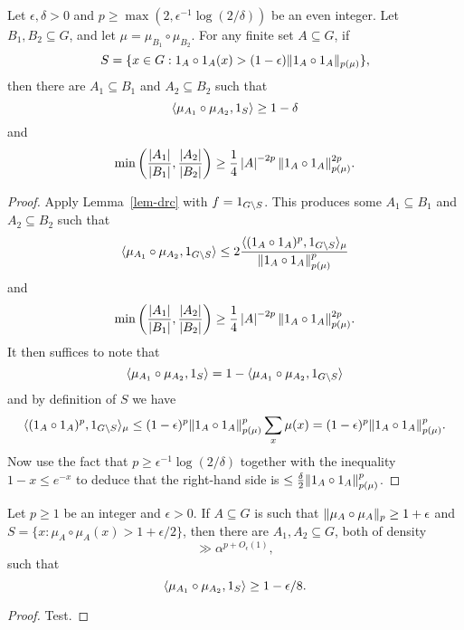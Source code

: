 \begin{lemma}
\label{lem-sift}
\leanok
Let $\epsilon,\delta >0$ and $p\geq \max(2,\epsilon^{-1}\log(2/\delta))$ be an even integer. Let $B_1,B_2\subseteq G$, and let $\mu=\mu_{B_1}\circ\mu_{B_2}$. For any finite set $A\subseteq G$, if
\[S=\{ x\in G: 1_{A}\circ 1_{A}(x)>(1-\epsilon)\lVert 1_{A}\circ 1_{A}\rVert_{p(\mu)}\},\]
then there are $A_1\subseteq B_1$ and $A_2\subseteq B_2$ such that
\[\langle \mu_{A_1}\circ\mu_{A_2},1_{S}\rangle \geq 1-\delta\]
and
\[\min\left( \frac{\left\lvert A_1\right\rvert}{\left\lvert B_1\right\rvert},\frac{\left\lvert A_2\right\rvert}{\left\lvert B_2\right\rvert}\right)\geq \frac{1}{4}\left\lvert A\right\rvert^{-2p}\lVert 1_{A}\circ 1_{A}\rVert_{p(\mu)}^{2p}.\]
\end{lemma}

\begin{proof}
\leanok
Apply Lemma~\ref{lem-drc} with $f=1_{G\backslash S}$. This produces some $A_1\subseteq B_1$ and $A_2\subseteq B_2$ such that
\[\langle \mu_{A_1}\circ \mu_{A_2}, 1_{G\backslash S}\rangle\leq 2\frac{\langle (1_{A}\circ 1_{A})^p,1_{G\backslash S}\rangle_\mu}{\lVert 1_{A}\circ 1_{A}\rVert_{p(\mu)}^p}\]
and
\[\min\left( \frac{\left\lvert A_1\right\rvert}{\left\lvert B_1\right\rvert},\frac{\left\lvert A_2\right\rvert}{\left\lvert B_2\right\rvert}\right)\geq \frac{1}{4}\left\lvert A\right\rvert^{-2p}\lVert 1_{A}\circ 1_{A}\rVert_{p(\mu)}^{2p}.\]
It then suffices to note that
\[\langle \mu_{A_1}\circ \mu_{A_2},1_{S}\rangle=1-\langle \mu_{A_1}\circ \mu_{A_2},1_{G\backslash S}\rangle\]
and by definition of $S$ we have
\[\langle (1_{A}\circ 1_{A})^p,1_{G\backslash S}\rangle_\mu\leq (1-\epsilon)^p\lVert 1_{A}\circ 1_{A}\rVert_{p(\mu)}^p\sum_{x}\mu(x)=(1-\epsilon)^p\lVert 1_{A}\circ 1_{A}\rVert_{p(\mu)}^p.\]
Now use the fact that $p\geq \epsilon^{-1}\log(2/\delta)$ together with the inequality $1-x\leq e^{-x}$ to deduce that the right-hand side is $\leq \tfrac{\delta}{2}\lVert 1_{A}\circ 1_{A}\rVert_{p(\mu)}^p$.
\end{proof}


\begin{corollary}
\label{global_drc}
Let $p\geq 1$ be an integer and $\epsilon>0$. If $A\subseteq G$ is such that $\lVert \mu_A\circ \mu_A\rVert_p \geq 1+\epsilon$ and $S=\{ x : \mu_A\circ \mu_A(x)>1+\epsilon/2\}$, then there are $A_1,A_2\subseteq G$, both of density
\[\gg \alpha^{p+O_\epsilon(1)},\]
such that
\[\langle \mu_{A_1}\circ \mu_{A_2},1_{S}\rangle \geq 1-\epsilon/8.\]
\end{corollary}

\begin{proof}
Test.
\end{proof}

